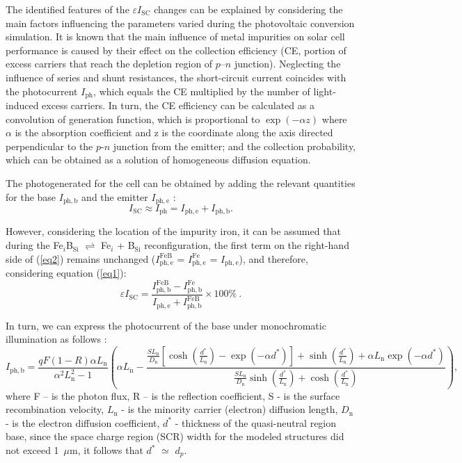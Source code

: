 \documentclass[a4paper,fleqn]{cas-sc}
\begin{document}
The identified features of the $\varepsilon I_\mathrm{SC}$ changes can be explained by considering the main factors influencing the parameters varied during the photovoltaic conversion simulation. It is known \cite{YangHandbookPVSi} that the main influence of metal impurities on solar cell performance is caused by their effect on the collection efficiency (CE, portion of excess carriers that reach the depletion region of $p$–$n$ junction). Neglecting the influence of series and shunt resistances, the short-circuit current coincides with the photocurrent $I_\mathrm{ph}$, which equals the CE multiplied by the number of light-induced excess carriers.  In turn, the CE efficiency can be calculated as a convolution of generation function, which is proportional to $\exp(-\alpha z)$ where $\alpha$ is the absorption coefficient and z is the coordinate along the axis directed perpendicular to the $p$-$n$ junction from the emitter; and the collection probability, which can be obtained as a solution of homogeneous diffusion equation.

The photogenerated for the cell can be obtained by adding the relevant quantities for the base $I_\mathrm{ph,b}$ and the emitter $I_\mathrm{ph,e}$ \cite{Markvart}:
\begin{equation}
\label{eq2}
     I_\mathrm{SC} \approx I_\mathrm{ph} = I_\mathrm{ph,e} + I_\mathrm{ph,b}.
\end{equation}

However, considering the location of the impurity iron, it can be assumed that during the Fe$_i$B$_\mathrm{Si}$ $\rightleftharpoons$ Fe$_i$ + B$_\mathrm{Si}$ reconfiguration, the first term on the right-hand side of (\ref{eq2}) remains unchanged ($I_\mathrm{ph,e}^\mathrm{FeB}$ = $I_\mathrm{ph,e}^\mathrm{Fe}$ = $I_\mathrm{ph,e}$), and therefore, considering equation (\ref{eq1}):
\begin{equation}
\label{eq3}
     \varepsilon I_\mathrm{SC} = \frac{I_\mathrm{ph,b}^\mathrm{FeB}-I_\mathrm{ph,b}^\mathrm{Fe}}{I_\mathrm{ph,e}+I_\mathrm{ph,b}^\mathrm{FeB}}\times 100 \%\ .
\end{equation}

In turn, we can express the photocurrent of the base under monochromatic illumination as follows \cite{Goetzberger1998}:
\begin{equation}
\label{eq4}
     I_\mathrm{ph,b}=\frac{qF(1-R)\alpha L_\mathrm{n}}{{\alpha}^2 L_\mathrm{n}^2 - 1}\left( \alpha L_\mathrm{n} - \frac{\frac{SL_\mathrm{n}}{D_\mathrm{n}}\left[ {\cosh\left( \frac{d^*}{L_\mathrm{n}} \right)} - \exp(-\alpha d^*) \right] + \sinh\left( \frac{d^*}{L_\mathrm{n}} \right) + \alpha L_\mathrm{n} \exp(-\alpha d^*)}{\frac{SL_\mathrm{n}}{D_\mathrm{n}}\sinh\left( \frac{d^*}{L_\mathrm{n}} \right) + \cosh\left( \frac{d^*}{L_\mathrm{n}} \right)} \right),
\end{equation}
where F – is the photon flux, R – is the reflection coefficient,
S - is the surface recombination velocity, $L_\mathrm{n}$ - is the minority carrier (electron) diffusion length, $D_\mathrm{n}$ - is the electron diffusion coefficient, $d^*$ - thickness of the quasi-neutral region base, since the space charge region (SCR) width for the modeled structures did not exceed 1~$\mu$m, it follows that $d^*$ $\simeq$ $d_p$.
\end{document}
